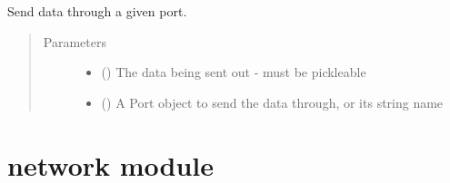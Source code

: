 \documentclass[letterpaper,10pt,openany,oneside,english]{sphinxmanual}
\begin{document}
\begin{fulllineitems}
\begin{fulllineitems}
\begin{quote}
\begin{description}
\begin{itemize}
\end{itemize}

\end{description}\end{quote}

\end{fulllineitems}


\begin{fulllineitems}
\label{\detokenize{src_rst/module:module.Module.send}}
Send data through a given port.
\begin{quote}\begin{description}
\item[{Parameters}] \leavevmode\begin{itemize}
\item {} 
 () \textendash{} The data being sent out - must be pickleable

\item {} 
 ({\hyperref[\detokenize{src_rst/port:port.Port}]{}}\sphinxstyleliteralemphasis{\sphinxupquote{, }}) \textendash{} A Port object to send the data through, or its string name

\end{itemize}

\end{description}\end{quote}

\end{fulllineitems}


\end{fulllineitems}



\section{network module}
\label{\detokenize{src_rst/network:module-network}}\label{\detokenize{src_rst/network:network-module}}\label{\detokenize{src_rst/network::doc}}
\end{document}
